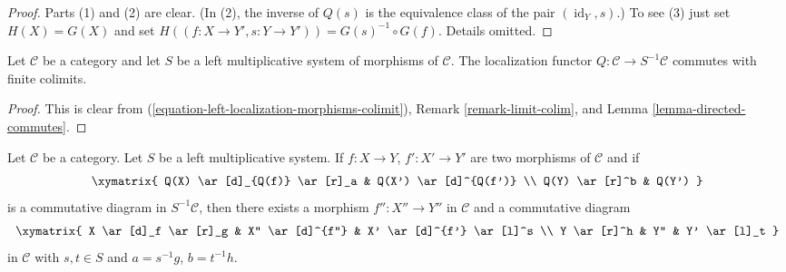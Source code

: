 \begin{proof}
Parts (1) and (2) are clear. (In (2), the inverse of $Q(s)$ is
the equivalence class of the pair $(\operatorname{id}_Y, s)$.)
To see (3) just set $H(X) = G(X)$
and set $H((f : X \to Y', s : Y \to Y')) = G(s)^{-1} \circ G(f)$.
Details omitted.
\end{proof}

\begin{lemma}
\label{lemma-left-localization-limits}
Let $\mathcal{C}$ be a category and let $S$ be a left multiplicative
system of morphisms of $\mathcal{C}$. The localization functor
$Q : \mathcal{C} \to S^{-1}\mathcal{C}$ commutes with finite colimits.
\end{lemma}

\begin{proof}
This is clear from (\ref{equation-left-localization-morphisms-colimit}),
Remark \ref{remark-limit-colim}, and
Lemma \ref{lemma-directed-commutes}.
\end{proof}

\begin{lemma}
\label{lemma-left-localization-diagram}
Let $\mathcal{C}$ be a category. Let $S$ be a left multiplicative
system. If $f : X \to Y$, $f' : X' \to Y'$ are two morphisms of
$\mathcal{C}$ and if
$$
\xymatrix{
Q(X) \ar[d]_{Q(f)} \ar[r]_a & Q(X') \ar[d]^{Q(f')} \\
Q(Y) \ar[r]^b & Q(Y')
}
$$
is a commutative diagram in $S^{-1}\mathcal{C}$, then there exists
a morphism $f'' : X'' \to Y''$ in $\mathcal{C}$ and a commutative
diagram
$$
\xymatrix{
X \ar[d]_f \ar[r]_g & X'' \ar[d]^{f''} & X' \ar[d]^{f'} \ar[l]^s \\
Y \ar[r]^h & Y'' & Y' \ar[l]_t
}
$$
in $\mathcal{C}$ with $s, t \in S$ and $a = s^{-1}g$, $b = t^{-1}h$.
\end{lemma}

